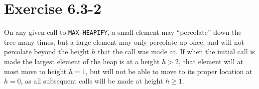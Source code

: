\documentclass{article}
\begin{document}
\section*{Exercise 6.3-2}

On any given call to \texttt{MAX-HEAPIFY}, a small element may ``percolate'' down the tree many times, but a large element may only percolate up once, and will not percolate beyond the height $h$ that the call was made at. If when the initial call is made the largest element of the heap is at a height $h > 2$, that element will at most move to height $h = 1$, but will not be able to move to its proper location at $h = 0$, as all subsequent calls will be made at height $h \geq 1$.
\end{document}
